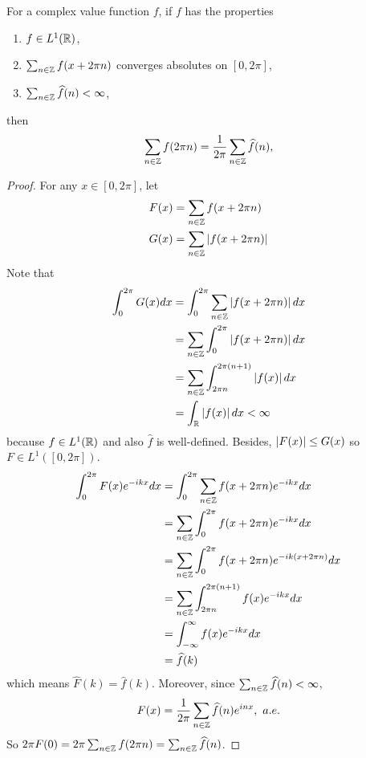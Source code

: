 \begin{enumerate}[label=\arabic*.]
	\begin{thm}
		For a complex value function $f$, if $f$ has the properties
		\begin{enumerate}[label=(\roman*)]
			\item $f \in L^1(\mathbb{R})$,
			\item $\sum_{n\in \mathbb{Z}} f(x+2\pi n)$ converges absolutes on $[0,2\pi]$,
			\item $\sum_{n \in \mathbb{Z}}\widehat{f}(n) < \infty$,
		\end{enumerate}
		then
		\begin{equation*}
			\sum_{n \in \mathbb{Z}} f(2\pi n) = \frac{1}{2\pi} \sum_{n \in \mathbb{Z}}\widehat{f}(n),
		\end{equation*}
	\end{thm}
	\begin{proof}
		For any $x \in [0,2\pi]$, let
		\begin{equation*}
			\begin{aligned}
				F(x) &= \sum_{n\in \mathbb{Z}} f(x+2\pi n) \\
				G(x) &= \sum_{n\in \mathbb{Z}} \left\lvert f(x+2\pi n)\right\lvert
			\end{aligned}
		\end{equation*}
		Note that
		\begin{equation*}
			\begin{aligned}
				\int_0^{2\pi}G(x)dx &= \int_0^{2\pi}\sum_{n\in \mathbb{Z}} \left\lvert f(x+2\pi n)\right\lvert dx \\
				&= \sum_{n\in \mathbb{Z}}\int_0^{2\pi} \left\lvert f(x+2\pi n)\right\lvert dx \\
				&= \sum_{n\in \mathbb{Z}}\int_{2\pi n}^{2\pi (n+1)} \left\lvert f(x)\right\lvert dx \\
				&= \int_{\mathbb{R}} \left\lvert f(x)\right\lvert dx < \infty
			\end{aligned}
		\end{equation*}
		because $f \in L^1(\mathbb{R})$ and also $\widehat{f}$ is well-defined. Besides, $\left\lvert F(x)\right\lvert \leq G(x)$ so $F \in L^1([0,2\pi])$.
		\begin{equation*}
			\begin{aligned}
				\int_0^{2\pi} F(x)e^{-ikx}dx &=  \int_0^{2\pi}  \sum_{n\in \mathbb{Z}} f(x+2\pi n)e^{-ikx}dx \\
				&= \sum_{n\in \mathbb{Z}} \int_0^{2\pi} f(x+2\pi n)e^{-ikx}dx \\
				&= \sum_{n\in \mathbb{Z}} \int_0^{2\pi} f(x+2\pi n)e^{-ik(x+2\pi n)}dx \\
				&= \sum_{n\in \mathbb{Z}} \int_{2\pi n}^{2\pi (n+1)} f(x)e^{-ikx}dx \\
				&= \int_{-\infty}^{\infty} f(x)e^{-ikx}dx \\
				&= \widehat{f}(k)
			\end{aligned}
		\end{equation*}
		which means $\widehat{F}(k) = \widehat{f}(k)$. Moreover, since $\sum_{n \in \mathbb{Z}}\widehat{f}(n) < \infty$,
		\begin{equation*}
			F(x) = \frac{1}{2\pi}\sum_{n\in \mathbb{Z}}\widehat{f}(n)e^{inx},~a.e.
		\end{equation*}
		So $2\pi F(0) = 2\pi\sum_{n \in \mathbb{Z}} f(2\pi n) = \sum_{n \in \mathbb{Z}}\widehat{f}(n)$.
	\end{proof}



\end{enumerate}
